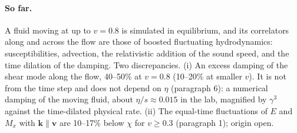 \documentclass[11pt,aps,preprint,nofootinbib,superscriptaddress,tightenlines]{revtex4-2}
\let\oldparagraph\paragraph
\renewcommand{\paragraph}{\par\bigskip\oldparagraph}
\begin{document}
\paragraph{So far.}  A fluid moving at up to $v=0.8$ is simulated in equilibrium, and its correlators
along and across the flow are those of boosted fluctuating hydrodynamics: susceptibilities, advection,
the relativistic addition of the sound speed, and the time dilation of the damping.  Two
discrepancies.  (i) An excess damping of the shear mode along the flow, 40--50\% at $v=0.8$ (10--20\% at
smaller $v$).  It is not from the time step and does not depend on $\eta$ (paragraph 6): a numerical
damping of the moving fluid, about $\eta/s\approx0.015$ in the lab, magnified by $\gamma^3$ against the
time-dilated physical rate.  (ii) The equal-time fluctuations of $E$ and $M_x$ with $\bm k\parallel\bm v$ are
10--17\% below $\chi$ for $v\ge0.3$ (paragraph 1); origin open.
\end{document}
